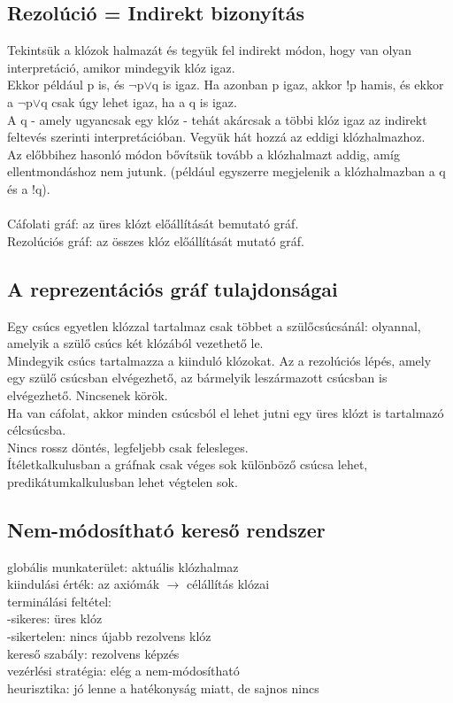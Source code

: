 \documentclass{article}
\begin{document}
	 \newpage
	 \subsection{Rezolúció = Indirekt bizonyítás}
	 Tekintsük a klózok halmazát és tegyük fel indirekt módon, hogy van olyan interpretáció, amikor mindegyik klóz igaz.\\
	 Ekkor például p is, és $\neg$p$\vee$q is igaz. Ha azonban p igaz, akkor !p hamis, és ekkor a $\neg$p$\vee$q csak úgy lehet igaz, ha a q is igaz.\\
	 A q - amely ugyancsak egy klóz - tehát akárcsak a többi klóz igaz az indirekt feltevés szerinti interpretációban. Vegyük hát hozzá az eddigi klózhalmazhoz.\\
	 Az előbbihez hasonló módon bővítsük tovább a klózhalmazt addig, amíg ellentmondáshoz nem jutunk. (például egyszerre megjelenik a klózhalmazban a q és a !q).\\ \\
	 Cáfolati gráf: az üres klózt előállítását bemutató gráf.\\
	 Rezolúciós gráf: az összes klóz előállítását mutató gráf.\\
	 
	 \subsection{A reprezentációs gráf tulajdonságai}
	 Egy csúcs egyetlen klózzal tartalmaz csak többet a szülőcsúcsánál: olyannal, amelyik a szülő csúcs két klózából vezethető le.\\
	 Mindegyik csúcs tartalmazza a kiinduló klózokat. Az a rezolúciós lépés, amely egy szülő csúcsban elvégezhető, az bármelyik leszármazott csúcsban is elvégezhető. Nincsenek körök.\\
	 Ha van cáfolat, akkor minden csúcsból el lehet jutni egy üres klózt is tartalmazó célcsúcsba.\\
	 Nincs rossz döntés, legfeljebb csak felesleges.\\
	 Ítéletkalkulusban a gráfnak csak véges sok különböző csúcsa lehet, predikátumkalkulusban lehet végtelen sok.
	 
	 \subsection{Nem-módosítható kereső rendszer}
	 globális munkaterület: aktuális klózhalmaz\\
	 kiindulási érték: az axiómák $\rightarrow$ célállítás klózai\\
	 terminálási feltétel:\\
	 -sikeres: üres klóz\\
	 -sikertelen: nincs újabb rezolvens klóz\\
	 kereső szabály: rezolvens képzés\\
	 vezérlési stratégia: elég a nem-módosítható\\
	 heurisztika: jó lenne a hatékonyság miatt, de sajnos nincs\\
	 
\end{document}
